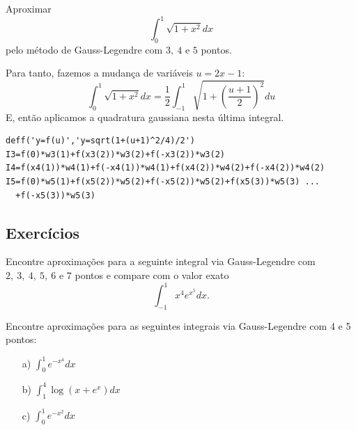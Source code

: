 \begin{ex} Aproximar
$$\int_{0}^1\sqrt{1+x^2}dx$$
pelo método de Gauss-Legendre com $3,\ 4$ e $5$ pontos.
\end{ex}
\begin{sol}
Para tanto, fazemos a mudança de variáveis $u=2x-1$:
\begin{equation*}
  \int_{0}^1\sqrt{1+x^2}dx=\frac{1}{2}\int_{-1}^1\sqrt{1+\left(\frac{u+1}{2}\right)^2}du
\end{equation*}
E, então aplicamos a quadratura gaussiana nesta última integral.
\ifisscilab
\begin{verbatim}
deff('y=f(u)','y=sqrt(1+(u+1)^2/4)/2')
I3=f(0)*w3(1)+f(x3(2))*w3(2)+f(-x3(2))*w3(2)
I4=f(x4(1))*w4(1)+f(-x4(1))*w4(1)+f(x4(2))*w4(2)+f(-x4(2))*w4(2)
I5=f(0)*w5(1)+f(x5(2))*w5(2)+f(-x5(2))*w5(2)+f(x5(3))*w5(3) ...
  +f(-x5(3))*w5(3)
\end{verbatim}
\fi  
\end{sol}

\subsection*{Exercícios}

\begin{Exercise}Encontre aproximações para a seguinte integral via Gauss-Legendre com $2,\ 3,\ 4,\ 5,\ 6$ e $7$ pontos e compare com o valor exato
$$\int_{-1}^1 x^4e^{x^5}dx.$$
\end{Exercise}

\begin{Exercise} Encontre aproximações para as seguintes integrais via Gauss-Legendre com 4 e 5 pontos:
\begin{itemize}
\item[a)] $\int_0^1 e^{-x^4}dx$
\item[b)] $\int_1^4 \log(x+e^x)dx$
\item[c)] $\int_0^1 e^{-x^2}dx$
\end{itemize}
\end{Exercise}

